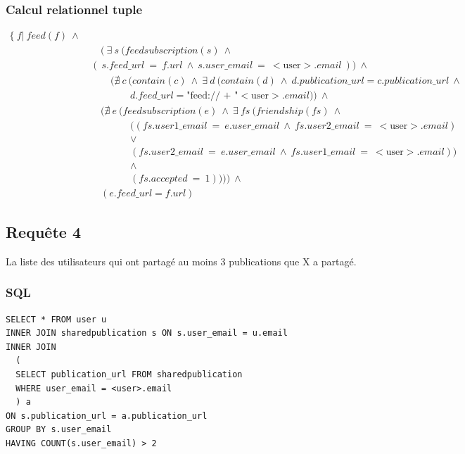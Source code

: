 \documentclass[a4paper,10pt]{article}
\begin{document}
\subsubsection{Calcul relationnel tuple}

\begin{equation*}
 \begin{split}
  \{\ f |\ feed(f)\ \wedge\ \\
  &\quad (\ \exists\ s\ (feedsubscription(s)\ \wedge\\
  &(\ s.feed\_url\ =\ f.url\ \wedge\ s.user\_email\ =\ <\text{user}>.email\ ))\   \wedge \\
  &\quad \quad(\nexists\ c\ (contain(c)\ \wedge\ \exists\ d\ (contain(d)\ \wedge\ d.publication\_url = c.publication\_url\ \wedge\ \\
  &\qquad \qquad d.feed\_url = \text{"feed:// + "}<\text{user}>.email) )\ \wedge \\
  &\quad (\nexists\ e\ (feedsubscription(e)\ \wedge\ \exists\ fs\ (friendship(fs)\ \wedge\ \\
  &\qquad \qquad ((fs.user1\_email\ =\ e.user\_email\ \wedge\ fs.user2\_email\ =\ <\text{user}>.email)\\
  &\qquad \qquad \vee\\
  &\qquad \qquad (fs.user2\_email\ =\ e.user\_email\ \wedge\ fs.user1\_email\ =\ <\text{user}>.email))\\
  &\qquad \qquad \wedge\\
  &\qquad \qquad (fs.accepted\ =\ 1))))\ \wedge \\
  &\quad (e.feed\_url = f.url)
  \end{split}
\end{equation*}

\subsection{Requête 4}
La liste des utilisateurs qui ont partagé au moins 3 publications que X a partagé.
\subsubsection{SQL}
\begin{lstlisting}
SELECT * FROM user u
INNER JOIN sharedpublication s ON s.user_email = u.email
INNER JOIN 
  (
  SELECT publication_url FROM sharedpublication 
  WHERE user_email = <user>.email
  ) a
ON s.publication_url = a.publication_url
GROUP BY s.user_email
HAVING COUNT(s.user_email) > 2
\end{lstlisting}
\end{document}
